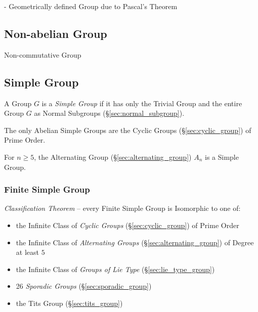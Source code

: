 - Geometrically defined Group due to Pascal's Theorem
  \cite{lemmermeyer-shirali09}



\subsection{Non-abelian Group}\label{sec:noncommutative_group}

Non-commutative Group



\subsection{Simple Group}\label{sec:simple_group}

A Group $G$ is a \emph{Simple Group} if it has only the Trivial Group and the
entire Group $G$ as Normal Subgroups (\S\ref{sec:normal_subgroup}).

The only Abelian Simple Groups are the Cyclic Groups
(\S\ref{sec:cyclic_group}) of Prime Order.

For $n \geq 5$, the Alternating Group (\S\ref{sec:alternating_group})
$A_n$ is a Simple Group.



\subsubsection{Finite Simple Group}\label{sec:finite_simple_group}

\emph{Classification Theorem} -- every Finite Simple Group is Isomorphic to one
of:
\begin{itemize}
  \item the Infinite Class of \emph{Cyclic Groups} (\S\ref{sec:cyclic_group}) of
    Prime Order
  \item the Infinite Class of \emph{Alternating Groups}
    (\S\ref{sec:alternating_group}) of Degree at least $5$
  \item the Infinite Class of \emph{Groups of Lie Type}
    (\S\ref{sec:lie_type_group})
  \item 26 \emph{Sporadic Groups} (\S\ref{sec:sporadic_group})
  \item the Tits Group (\S\ref{sec:tits_group})
\end{itemize}



